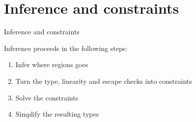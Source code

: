 \documentclass[aspectratio=169,dvipsnames,svgnames,10pt]{beamer}
\begin{document}
\section{Inference and constraints}

\begin{frame}{Inference and constraints}

  Inference proceeds in the following steps:

  \begin{enumerate}
  \item Infer where regions goes
  \item Turn the type, linearity and escape checks into constraints
  \item Solve the constraints
  \item Simplify the resulting types
  \end{enumerate}
\end{frame}



\end{document}
